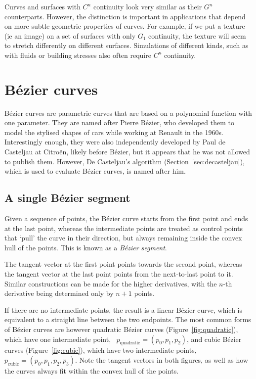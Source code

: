 Curves and surfaces with \(C^n\) continuity look very similar as their \(G^n\) counterparts.
However, the distinction is important in applications that depend on more subtle geometric properties of curves.
For example, if we put a texture (ie an image) on a set of surfaces with only 
\(G_1\) continuity, the texture will seem to stretch differently on different surfaces.
Simulations of different kinds, such as with fluids or building stresses also often require \(C^n\) continuity.

\section{B\'ezier curves}

B\'ezier curves are parametric curves that are based on a polynomial function with one parameter.
They are named after Pierre B\'ezier, who developed them to model the stylised shapes of cars while working at Renault in the 1960s.
Interestingly enough, they were also independently developed by Paul de Casteljau at Citro\"en, likely before B\'ezier, but it appears that he was not allowed to publish them.
However, De Casteljau's algorithm (Section~\ref{sec:decasteljau}), which is used to evaluate B\'ezier curves, is named after him.

\subsection{A single B\'ezier segment}

Given a sequence of points, the B\'ezier curve starts from the first point and ends at the last point, whereas the intermediate points are treated as control points that `pull' the curve in their direction, but always remaining inside the convex hull of the points.
This is known as a \emph{B\'ezier segment}.

The tangent vector at the first point points towards the second point, whereas the tangent vector at the last point points from the next-to-last point to it.
Similar constructions can be made for the higher derivatives, with the \(n\)-th derivative being determined only by \(n+1\) points.

If there are no intermediate points, the result is a linear B\'ezier curve, which is equivalent to a straight line between the two endpoints.
The most common forms of B\'ezier curves are however quadratic B\'ezier curves (Figure~\ref{fig:quadratic}), which have one intermediate point, \eg\ \(p_{\mathrm{quadratic}} = (p_0, p_1, p_2)\), and cubic B\'ezier curves (Figure~\ref{fig:cubic}), which have two intermediate points, \eg\ \(p_{\mathrm{cubic}} = (p_0, p_1, p_2, p_3)\).
Note the tangent vectors in both figures, as well as how the curves always fit within the convex hull of the points.

